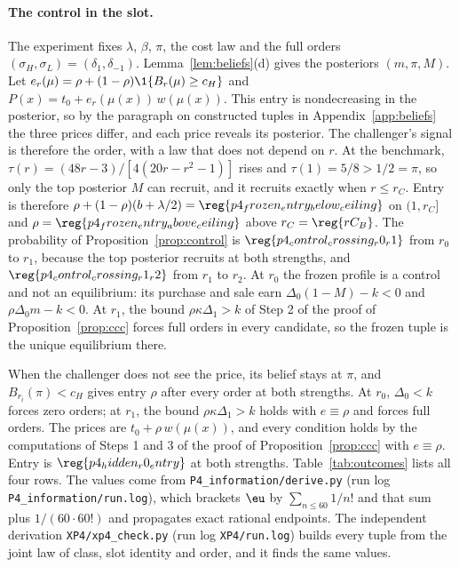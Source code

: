 \paragraph{The control in the slot.}
The experiment fixes \(\lambda\), \(\beta\), \(\pi\), the cost law and the full orders
\((\sigma_H,\sigma_L)=(\delta_1,\delta_{-1})\). Lemma~\ref{lem:beliefs}(d) gives the posteriors \((m,\pi,M)\). Let
\(e_r(\mu)=\rho+(1-\rho)\1\{B_r(\mu)\ge c_H\}\) and \(P(x)=t_0+e_r(\mu(x))\,w(\mu(x))\). This entry is nondecreasing
in the posterior, so by the paragraph on constructed tuples in Appendix~\ref{app:beliefs} the three prices differ,
and each price reveals its posterior. The challenger's signal is therefore the order, with a law that does not
depend on \(r\). At the benchmark, \(\tau(r)=(48r-3)/[4(20r-r^2-1)]\) rises and \(\tau(1)=5/8>1/2=\pi\), so only the
top posterior \(M\) can recruit, and it recruits exactly when \(r\le r_C\). Entry is therefore
\(\rho+(1-\rho)(b+\lambda/2)=\reg{p4_frozen_entry_below_ceiling}\) on \((1,r_C]\) and
\(\rho=\reg{p4_frozen_entry_above_ceiling}\) above \(r_C=\reg{rC_B}\). The probability of
Proposition~\ref{prop:control} is \(\reg{p4_control_crossing_r0_r1}\) from \(r_0\) to \(r_1\), because the top posterior
recruits at both strengths, and \(\reg{p4_control_crossing_r1_r2}\) from \(r_1\) to \(r_2\). At \(r_0\) the frozen profile
is a control and not an equilibrium: its purchase and sale earn \(\Delta_0(1-M)-k<0\) and \(\rho\Delta_0m-k<0\). At
\(r_1\), the bound \(\rho\kappa\Delta_1>k\) of Step 2 of the proof of Proposition~\ref{prop:ccc} forces full orders
in every candidate, so the frozen tuple is the unique equilibrium there.

When the challenger does not see the price, its belief stays at \(\pi\), and \(B_{r_i}(\pi)<c_H\) gives entry
\(\rho\) after every order at both strengths. At \(r_0\), \(\Delta_0<k\) forces zero orders; at \(r_1\), the bound
\(\rho\kappa\Delta_1>k\) holds with \(e\equiv\rho\) and forces full orders. The prices are
\(t_0+\rho\,w(\mu(x))\), and every condition holds by the computations of Steps 1 and 3 of the proof of
Proposition~\ref{prop:ccc} with \(e\equiv\rho\). Entry is \(\reg{p4_hidden_r0_entry}\) at both strengths.
Table~\ref{tab:outcomes} lists all four rows. The values come from
\nolinkurl{P4_information/derive.py} (run log
\nolinkurl{P4_information/run.log}), which brackets \(\eu\) by
\(\sum_{n\le60}1/n!\) and that sum plus \(1/(60\cdot60!)\) and propagates exact rational endpoints. The independent
derivation \nolinkurl{XP4/xp4_check.py} (run log
\nolinkurl{XP4/run.log}) builds every tuple from the joint law of class,
slot identity and order, and it finds the same values.

